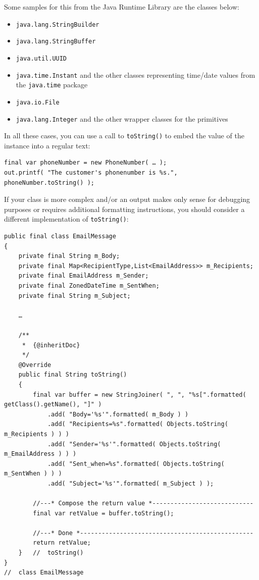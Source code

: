 \documentclass[11pt,a4paper, titlepage, parskip=half, headsepline, footsepline, cleardoublepage=current, headheight=1cm]{scrbook}
\begin{document}
Some samples for this from the Java Runtime Library are the classes below:
\begin{itemize}
\item\lstinline|java.lang.StringBuilder|\autocite{ORACLE_DOC_STRINGBUILDER_CLASS}
\item\lstinline|java.lang.StringBuffer|\autocite{ORACLE_DOC_STRINGBUFFER_CLASS}
\item\lstinline|java.util.UUID|\autocite{ORACLE_DOC_UUID_CLASS}
\item\lstinline|java.time.Instant|\autocite{ORACLE_DOC_INSTANT_CLASS} and the other classes representing time/date values from the \lstinline|java.time| package\autocite{ORACLE_DOC_TIME_PACKAGE}
\item\lstinline|java.io.File|\autocite{ORACLE_DOC_FILE_CLASS}
\item\lstinline|java.lang.Integer|\autocite{ORACLE_DOC_INTEGER_CLASS} and the other wrapper classes for the primitives
\end{itemize}

In all these cases, you can use a call to \lstinline|toString()| to embed the value of the instance into a regular text:
\begin{lstlisting}
final var phoneNumber = new PhoneNumber( … );
out.printf( "The customer's phonenumber is %s.", phoneNumber.toString() );
\end{lstlisting}

If your class is more complex and/or an output makes only sense for debugging purposes or requires additional formatting instructions, you should consider a different implementation of \lstinline|toString()|:
\begin{lstlisting}
public final class EmailMessage
{
    private final String m_Body;
    private final Map<RecipientType,List<EmailAddress>> m_Recipients;
    private final EmailAddress m_Sender;
    private final ZonedDateTime m_SentWhen;
    private final String m_Subject;
    
    …
    
    /**
     *  {@inheritDoc}
     */
    @Override 
    public final String toString()
    {
        final var buffer = new StringJoiner( ", ", "%s[".formatted( getClass().getName(), "]" )
            .add( "Body='%s'".formatted( m_Body ) )
            .add( "Recipients=%s".formatted( Objects.toString( m_Recipients ) ) )
            .add( "Sender='%s'".formatted( Objects.toString( m_EmailAddress ) ) )
            .add( "Sent_when=%s".formatted( Objects.toString( m_SentWhen ) ) )
            .add( "Subject='%s'".formatted( m_Subject ) );
            
        //---* Compose the return value *----------------------------    
        final var retValue = buffer.toString();
        
        //---* Done *------------------------------------------------
        return retValue;
    }   //  toString()
}
//  class EmailMessage
\end{lstlisting}
\end{document}
